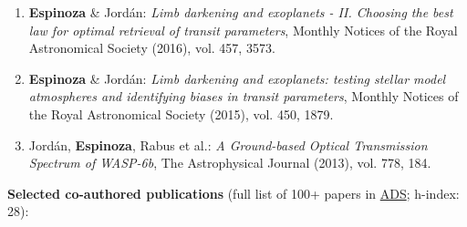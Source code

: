 \documentclass[12pt, a4paper]{article} %
\begin{document}
\begin{flushleft}
\begin{enumerate}
\item \textbf{Espinoza} \& Jord\'an: \textit{Limb darkening and exoplanets - II. Choosing the best law for optimal retrieval of transit parameters}, Monthly Notices of the Royal Astronomical Society (2016), vol. 457, 3573.
\item \textbf{Espinoza} \& Jord\'an: \textit{Limb darkening and exoplanets: testing stellar model atmospheres and identifying biases in transit parameters}, Monthly Notices of the Royal Astronomical Society (2015), vol. 450, 1879.
\item Jord\'an, \textbf{Espinoza}, Rabus et al.: \textit{A Ground-based Optical Transmission Spectrum of WASP-6b}, The Astrophysical Journal (2013), vol. 778, 184.
\end{enumerate}

\textbf{Selected co-authored publications} (full list of 100+ papers in \href{https://ui.adsabs.harvard.edu/public-libraries/JAL40dT5ToGup2Omjvc3Ag}{ADS}; h-index: 28):
\begin{itemize}
\setlength\itemsep{0.05cm}


\end{itemize}
\end{flushleft}
\end{document}
